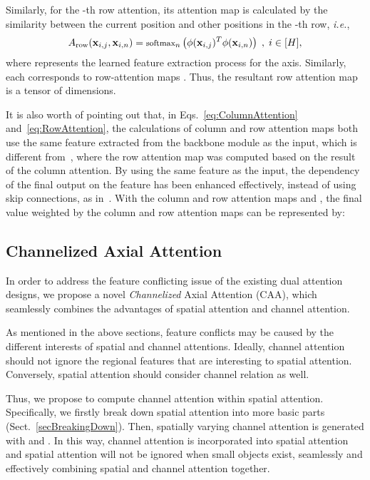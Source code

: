 \documentclass[letterpaper]{article} \usepackage{aaai22}  \usepackage{times}  \usepackage{helvet}  \usepackage{courier}  \usepackage[hyphens]{url}  \usepackage{graphicx} \urlstyle{rm} \def\UrlFont{\rm}  \usepackage{natbib}  \usepackage{caption} \DeclareCaptionStyle{ruled}{labelfont=normalfont,labelsep=colon,strut=off} \frenchspacing  \setlength{\pdfpagewidth}{8.5in}  \setlength{\pdfpageheight}{11in}  \usepackage{algorithm}
\begin{document}
Similarly, for the -th row attention, 
its attention map is calculated by the similarity between the current position  and other positions   in the -th row, \textit{i.e.},
\begin {equation} 
\footnotesize
A_\text{row}( \mathbf{x}_{i,j}, \mathbf{x}_{i,n}) = \text{softmax}_{n}\left(\phi( \mathbf{x}_{i,j})^T \phi( \mathbf{x}_{i,n})\right) \ , \ i \in [H],
\label{eq:RowAttention}
\end {equation}
where  represents the learned feature extraction process for the  axis. 
Similarly, each  corresponds to  row-attention maps .
Thus, the resultant row attention map  is a tensor of  dimensions.


It is also worth of pointing out that, in Eqs.~\eqref{eq:ColumnAttention} and~\eqref{eq:RowAttention}, the calculations of column and row attention maps both use the same feature  extracted from the backbone module as the input, which is different from~\cite{cAxialDeepLab}, where the row attention map was computed based on the result of the column attention. 
By using the same feature as the input, the dependency of the final output  on the feature  has been enhanced effectively, instead of using skip connections, as in~\cite{cAxialDeepLab}. \fi
With the column and row attention maps  and , the final value weighted by the column and row attention maps can be represented by: 



\subsection {Channelized Axial Attention}
\label{sChannelizedAttention}

In order to address the feature conflicting issue of the existing dual attention designs, we propose a novel \textit{Channelized} Axial Attention (CAA), which seamlessly combines the advantages of spatial attention and channel attention.

As mentioned in the above sections, feature conflicts may be caused by the different interests of spatial and channel attentions. 
Ideally, channel attention should not ignore the regional features that are interesting to spatial attention. 
Conversely, spatial attention should consider channel relation as well.

Thus, we propose to compute channel attention within spatial attention. Specifically, we firstly break down spatial attention into more basic parts (Sect.~\ref{secBreakingDown}). Then, spatially varying channel attention is generated with  and . In this way, channel attention is incorporated into spatial attention and spatial attention will not be ignored when small objects exist, seamlessly and effectively combining spatial and channel attention together.
\end{document}
